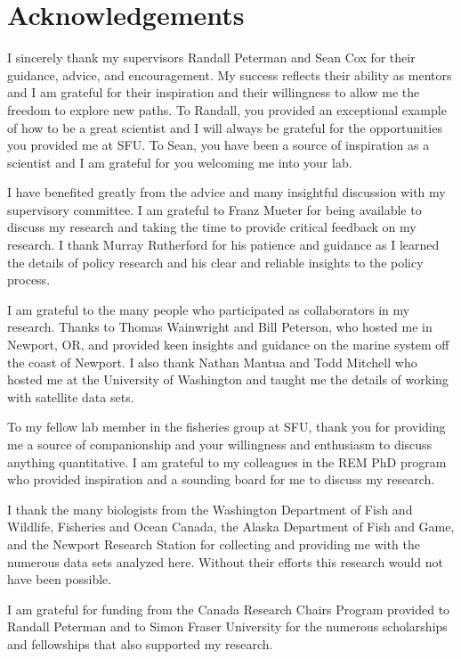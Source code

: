 

\chapter*{Acknowledgements}

I sincerely thank my supervisors Randall Peterman and Sean Cox for their
guidance, advice, and encouragement. My success reflects their ability as
mentors and I am grateful for their inspiration and their willingness to allow
me the freedom to explore new paths. To Randall, you provided an exceptional
example of how to be a great scientist and I will always be grateful for the
opportunities you provided me at SFU. To Sean, you have been a source of
inspiration as a scientist and I am grateful for you welcoming me into your lab.

I have benefited greatly from the advice and  many insightful discussion with my
supervisory committee. I am grateful to Franz Mueter for being available to
discuss my research and taking the time to provide critical feedback on my
research.  I thank Murray Rutherford for his patience and guidance as I learned
the details of policy research and his clear and reliable insights to the policy
process.

I am grateful to the many people who participated as collaborators in my
research.  Thanks to Thomas Wainwright and Bill Peterson, who hosted me in
Newport, OR, and provided keen insights and guidance on the marine system off
the coast of Newport. I also thank Nathan Mantua and Todd Mitchell who hosted me
at the University of Washington and taught me the details of working with
satellite data sets.

To my fellow lab member in the fisheries group at SFU, thank you for providing
me a source of companionship and your willingness and enthusiasm to discuss
anything quantitative. I am grateful to my colleagues in the REM PhD program who
provided inspiration and a sounding board for me to discuss my research.

I thank the many biologists from the Washington Department of Fish and Wildlife,
Fisheries and Ocean Canada, the Alaska Department of Fish and Game, and the
Newport Research Station for collecting and providing me with the numerous data
sets analyzed here.  Without their efforts this research would not have been
possible.  

I am grateful for funding from the Canada Research Chairs Program provided to
Randall Peterman and to Simon Fraser University for the numerous scholarships
and fellowships that also supported my research.

